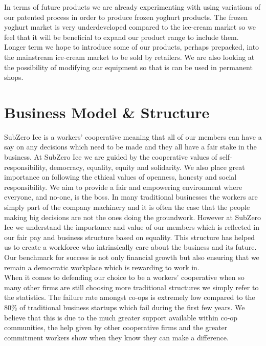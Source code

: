 \documentclass{article}
\begin{document}
  In terms of future products we are already experimenting with using variations of our patented process in order to produce frozen yoghurt products. The frozen yoghurt market is very underdeveloped compared to the ice-cream market so we feel that it will be beneficial to expand our product range to include them. Longer term we hope to introduce some of our products, perhaps prepacked, into the mainstream ice-cream market to be sold by retailers. We are also looking at the possibility of modifying our equipment so that is can be used in permanent shops.


\section{Business Model \& Structure}

  SubZero Ice is a workers' cooperative meaning that all of our members can have a say on any decisions which need to be made and they all have a fair stake in the business. At SubZero Ice we are guided by the cooperative values of self-responsibility, democracy, equality, equity and solidarity. We also place great importance on following the ethical values of openness, honesty and social responsibility. We aim to provide a fair and empowering environment where everyone, and no-one, is the boss. In many traditional businesses the workers are simply part of the company machinery and it is often the case that the people making big decisions are not the ones doing the groundwork. However at SubZero Ice we understand the importance and value of our members which is reflected in our fair pay and business structure based on equality. This structure has helped us to create a workforce who intrinsically care about the business and its future. Our benchmark for success is not only financial growth but also ensuring that we remain a democratic workplace which is rewarding to work in. \\

  When it comes to defending our choice to be a workers' cooperative when so many other firms are still choosing more traditional structures we simply refer to the statistics. The failure rate amongst co-ops is extremely low compared to the 80\% of traditional business startups which fail during the first few years. We believe that this is due to the much greater support available within co-op communities, the help given by other cooperative firms and the greater commitment workers show when they know they can make a difference. \\
\end{document}
